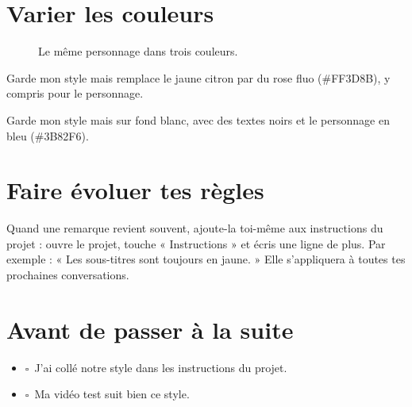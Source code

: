 \documentclass[11pt,oneside,openany]{book}
\newcommand{\coche}{$\square$\ }
\newenvironment{bilan}{\section*{Avant de passer à la suite}\begin{itemize}[label={}]}{\end{itemize}}
\def\persocoul{citron}
\newcommand{\persovert}[3]{%
\begin{scope}[yscale=-1,x=#1pt,y=#1pt]
\pgfmathsetmacro{\ep}{10*#1}
\tikzset{membre/.style={fill=\persocoul,draw=black,line width=\ep pt,rounded corners=8*#1pt}}
\draw[membre] (24,136) rectangle ++(24,112);
\draw[membre] (52,136) rectangle ++(24,112);
\draw[membre,rounded corners=12*#1pt] (22,52) rectangle ++(56,94);
\draw[membre,rotate around={#2:(11,62)}] (2,54) rectangle ++(18,86);
\draw[membre,rotate around={#3:(89,62)}] (80,54) rectangle ++(18,86);
\draw[fill=\persocoul,draw=black,line width=\ep pt] (50,24) circle (22);
\end{scope}}
\begin{document}
\section{Varier les couleurs}
\begin{figure}[H]\centering
{}
\caption{Le même personnage dans trois couleurs.}
\end{figure}
\begin{acopier}
Garde mon style mais remplace le jaune citron par du rose fluo (\#FF3D8B), y compris pour le personnage.
\end{acopier}
\begin{acopier}
Garde mon style mais sur fond blanc, avec des textes noirs et le personnage en bleu (\#3B82F6).
\end{acopier}

\section{Faire évoluer tes règles}
Quand une remarque revient souvent, ajoute-la toi-même aux instructions du projet : ouvre le projet, touche « Instructions » et écris une ligne de plus. Par exemple : « Les sous-titres sont toujours en jaune. » Elle s'appliquera à toutes tes prochaines conversations.

\begin{bilan}
  \item \coche J'ai collé notre style dans les instructions du projet.
  \item \coche Ma vidéo test suit bien ce style.
\end{bilan}
\end{document}
